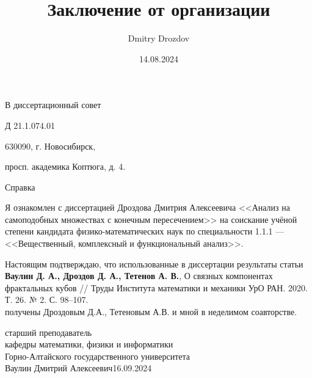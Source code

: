 \documentclass[14pt, a4paper]{extarticle}
\title{Заключение от организации}
\author{Dmitry Drozdov}
\date{14.08.2024}
\begin{document}
\noindent\hspace{9cm}В диссертационный совет

\noindent\hspace{9cm}Д 21.1.074.01

\noindent\hspace{9cm}630090, г. Новосибирск, 

\noindent\hspace{9cm}просп. академика Коптюга, д. 4.



\begin{center}
Справка 
\end{center}

Я ознакомлен с диссертацией Дроздова Дмитрия Алексеевича <<Анализ на самоподобных множествах с конечным пересечением>> на соискание учёной степени кандидата физико-математических наук по специальности 1.1.1 --- <<Вещественный, комплексный и функциональный анализ>>.

Настоящим подтверждаю, что использованные в диссертации результаты статьи\\
{\bf Ваулин Д. А., Дроздов Д. А., Тетенов А. В.}, О связных компонентах фрактальных кубов // Труды Института математики и механики УрО РАН. 2020. Т. 26. № 2. С. 98--107.\\
получены Дроздовым Д.А., Тетеновым А.В. и мной в неделимом соавторстве.

\vspace{1cm}


\noindent старший преподаватель\\
\noindent кафедры математики, физики и информатики\\
Горно-Алтайского государственного университета \\
\noindent Ваулин Дмитрий Алексеевич\hfill 16.09.2024

\end{document}
